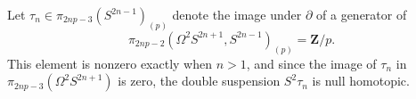 Let $\tau_n \in \pi_{2np-3}(S^{2n-1})_{(p)}$ denote the image under $\partial$ of a generator of
\[
\pi_{2np-2}(\Omega^2 S^{2n+1}, S^{2n-1})_{(p)} = \mathbf{Z}/p.
\]
This element is nonzero exactly when $n > 1$, and since the image of $\tau_n$ in $\pi_{2np-3}(\Omega^2 S^{2n+1})$ is zero, the double suspension $S^2 \tau_n$ is null homotopic.
